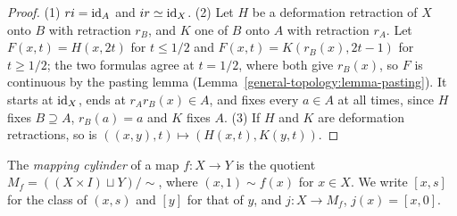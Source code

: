 \begin{proof}
(1) $ri = \mathrm{id}_A$ and $ir \simeq \mathrm{id}_X$. (2) Let $H$ be a deformation retraction of $X$ onto $B$ with retraction $r_B$, and $K$ one of $B$ onto $A$ with
retraction $r_A$. Let $F(x, t) = H(x, 2t)$ for $t \leq 1/2$ and $F(x, t) = K(r_B(x), 2t - 1)$ for $t \geq 1/2$; the two formulas agree at $t = 1/2$, where both
give $r_B(x)$, so $F$ is continuous by the pasting lemma (Lemma~\ref{general-topology:lemma-pasting}). It starts at $\mathrm{id}_X$, ends at $r_Ar_B(x) \in A$, and
fixes every $a \in A$ at all times, since $H$ fixes $B \supseteq A$, $r_B(a) = a$ and $K$ fixes $A$. (3) If $H$ and $K$ are deformation retractions, so is
$((x, y), t) \mapsto (H(x, t), K(y, t))$.
\end{proof}

\begin{definition}\label{homotopy:definition-mapping-cylinder}
The \emph{mapping cylinder} of a map $f \colon X \to Y$ is the quotient $M_f = ((X \times I) \sqcup Y)/\sim$, where $(x, 1) \sim f(x)$ for $x \in X$. We write
$[x, s]$ for the class of $(x, s)$ and $[y]$ for that of $y$, and $j \colon X \to M_f$, $j(x) = [x, 0]$.
\end{definition}

